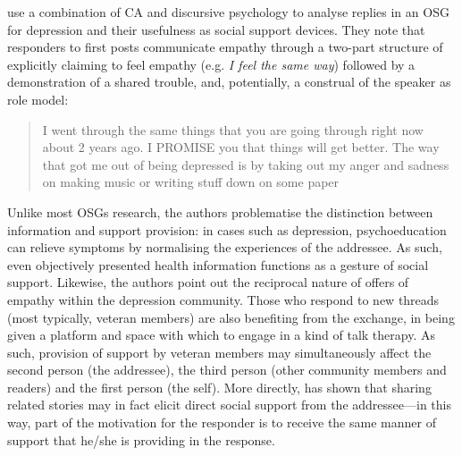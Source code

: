 
\textcite{kaufman2016producing} use a combination of \gls{CA} and discursive psychology to analyse replies in an \gls{OSG} for depression and their usefulness as social support devices. They note that responders to first \glspl{post} communicate empathy through a two\hyp{}part structure of explicitly claiming to feel empathy (e.g. \emph{I feel the same way}) followed by a demonstration of a shared trouble, and, potentially, a construal of the speaker as role model:

\begin{quote}\small\singlespacing
I went through the same things that you are going through right now about 2 years ago. I PROMISE you that things will get better. The way that got me out of being depressed is by taking out my anger and sadness on making music or writing stuff down on some paper \parencite*[p.~8]{kaufman2016producing} 
\end{quote}
%
Unlike most \glspl{OSG} research, the authors problematise the distinction between information and support provision: in cases such as depression, psychoeducation can relieve symptoms by normalising the experiences of the addressee. As such, even objectively presented health information functions as a gesture of social support. Likewise, the authors point out the reciprocal nature of offers of empathy within the depression community. Those who respond to new \glspl{thread} (most typically, veteran \glspl{member}) are also benefiting from the exchange, in being given a platform and space with which to engage in a kind of talk therapy. As such, provision of support by veteran \glspl{member} may simultaneously affect the second person (the addressee), the third person (other community \glspl{member} and readers) and the first person (the self). More directly, \textcite{pudlinski_giving_1998} has shown that sharing related stories may in fact elicit direct social support from the addressee---in this way, part of the motivation for the responder is to receive the same manner of support that he\slash she is providing in the response.

